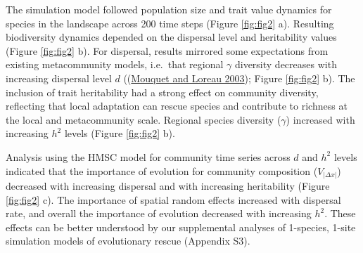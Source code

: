 \documentclass[
]{article}
\begin{document}
The simulation model followed population size and trait value dynamics for species in the landscape across 200 time steps (Figure \ref{fig:fig2} a). Resulting biodiversity dynamics depended on the dispersal level and heritability values (Figure \ref{fig:fig2} b). For dispersal, results mirrored some expectations from existing metacommunity models, i.e.~that regional \(\gamma\) diversity decreases with increasing dispersal level \(d\) ((\protect\hyperlink{ref-Mouquet2003}{Mouquet and Loreau 2003}); Figure \ref{fig:fig2} b). The inclusion of trait heritability had a strong effect on community diversity, reflecting that local adaptation can rescue species and contribute to richness at the local and metacommunity scale. Regional species diversity (\(\gamma\)) increased with increasing \(h^2\) levels (Figure \ref{fig:fig2} b).

Analysis using the HMSC model for community time series across \(d\) and \(h^2\) levels indicated that the importance of evolution for community composition (\(V_{|\Delta x|}\)) decreased with increasing dispersal and with increasing heritability (Figure \ref{fig:fig2} c). The importance of spatial random effects increased with dispersal rate, and overall the importance of evolution decreased with increasing \(h^2\). These effects can be better understood by our supplemental analyses of 1-species, 1-site simulation models of evolutionary rescue (Appendix S3).
\end{document}
